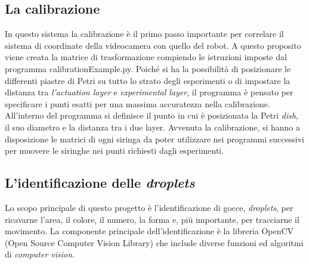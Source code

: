 \subsection{La calibrazione}
\label{sec:01123}
In questo sistema la calibrazione è il primo passo importante per correlare il sistema di coordinate della videocamera con quello del robot. A questo proposito viene creata la matrice di trasformazione compiendo le istruzioni imposte dal programma calibrationExample.py. 
Poiché si ha la possibilità di posizionare le differenti piastre di Petri su tutto lo strato degli esperimenti o di impostare la distanza tra \emph{l'actuation layer} e \emph{experimental layer}, il programma è pensato per specificare i punti esatti per una massima accuratezza nella calibrazione. All'interno del programma si definisce il punto in cui è posizionata la Petri \emph{dish}, il suo diametro e la distanza tra i due layer.
Avvenuta la calibrazione, si hanno a disposizione le matrici di ogni siringa da poter utilizzare nei programmi successivi per muovere le siringhe nei punti richiesti dagli esperimenti.

\subsection{L'identificazione delle \emph{droplets}}
\label{sec:02123}
Lo scopo principale di questo progetto è l'identificazione di gocce, \emph{droplets}, per ricavarne l'area, il colore, il numero, la forma e, più importante, per tracciarne il movimento.
La componente principale dell'identificazione è la libreria OpenCV (Open Source Computer Vision Library)\cite{opencv} che include diverse funzioni ed algoritmi di \emph{computer vision}. 











 

